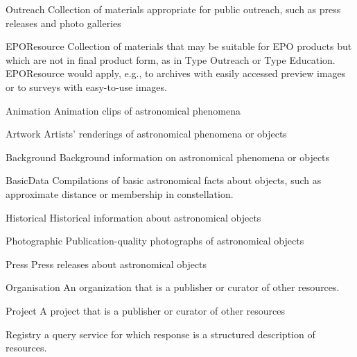 \documentclass[11pt,a4paper]{ivoa}
\begin{document}
\begin{bigdescription}
\begin{description}
\begin{longtermsdescription}
\item[Outreach]
               Collection of materials appropriate for public outreach, such
               as press releases and photo galleries
             
\item[EPOResource]
               Collection of materials that may be suitable for EPO
               products but which are not in final product form, as in Type 
               Outreach or Type Education.  EPOResource would apply,
               e.g., to archives with easily accessed preview images or to
               surveys with easy-to-use images.
             
\item[Animation]
               Animation clips of astronomical phenomena
             
\item[Artwork]
               Artists' renderings of astronomical phenomena or objects
             
\item[Background]
               Background information on astronomical phenomena or objects
             
\item[BasicData]
               Compilations of basic astronomical facts about objects,
               such as approximate distance or membership in constellation.
             
\item[Historical]
               Historical information about astronomical objects
             
\item[Photographic]
               Publication-quality photographs of astronomical objects
             
\item[Press]
               Press releases about astronomical objects
             
\item[Organisation]
               An organization that is a publisher or curator of other 
               resources.
             
\item[Project]
               A project that is a publisher or curator of other resources
             
\item[Registry]
               a query service for which response is a structured
               description of resources.
             

\end{longtermsdescription}
\end{description}
\end{bigdescription}
\end{document}
